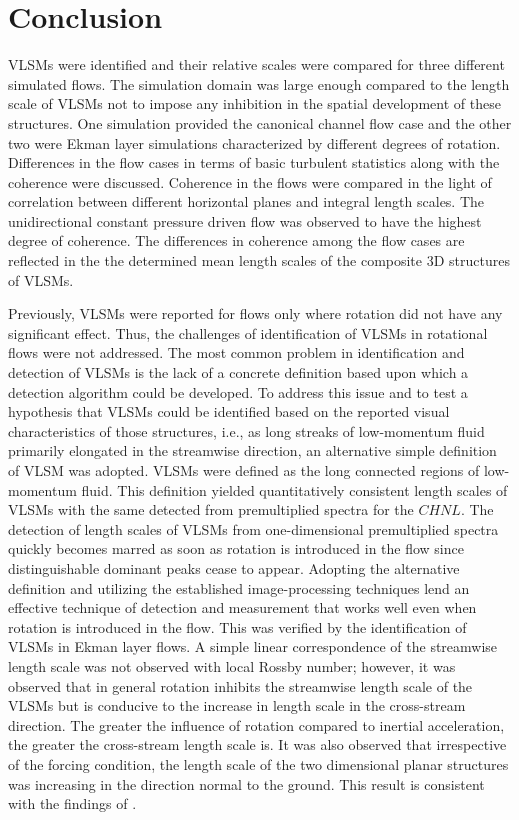 \section{Conclusion}
VLSMs were identified and their relative scales were compared for three different simulated flows. The simulation domain was large enough compared to the length scale of VLSMs not to impose any inhibition in the spatial development of these structures. One simulation provided the canonical channel flow case and the other two were Ekman layer simulations characterized by different degrees of rotation. Differences in the flow cases in terms of basic turbulent statistics along with the coherence were discussed. Coherence in the flows were compared in the light of correlation between different horizontal planes and integral length scales. The unidirectional constant pressure driven flow was observed to have the highest degree of coherence. The differences in coherence among the flow cases are reflected in the the determined mean length scales of the composite 3D structures of VLSMs.

Previously, VLSMs were reported for flows only where rotation did not have any significant effect. Thus, the challenges of identification of VLSMs in rotational flows were not addressed. The most common problem in identification and detection of VLSMs is the lack of a concrete definition based upon which a detection algorithm could be developed. To address this issue and to test a hypothesis that VLSMs could be identified based on the reported visual characteristics of those structures, i.e., as long streaks of low-momentum fluid primarily elongated in the streamwise direction, an alternative simple definition of VLSM was adopted. VLSMs were defined as the long connected regions of low-momentum fluid. This definition yielded quantitatively consistent length scales of VLSMs with the same detected from premultiplied spectra for the $CHNL$. The detection of length scales of VLSMs from one-dimensional premultiplied spectra quickly becomes marred as soon as rotation is introduced in the flow since distinguishable dominant peaks cease to appear. Adopting the alternative definition and utilizing the established image-processing techniques lend an effective technique of detection and measurement that works well even when rotation is introduced in the flow. This was verified by the identification of VLSMs in Ekman layer flows. A simple linear correspondence of the streamwise length scale was not observed with local Rossby number; however, it was observed that in general rotation inhibits the streamwise length scale of the VLSMs but is conducive to the increase in length scale in the cross-stream direction. The greater the influence of rotation compared to inertial acceleration, the greater the cross-stream length scale is. It was also observed that irrespective of the forcing condition, the length scale of the two dimensional planar structures was increasing in the direction normal to the ground. This result is consistent with the findings of  \citet{de_silva_hutchins_jfm_2016}.  

